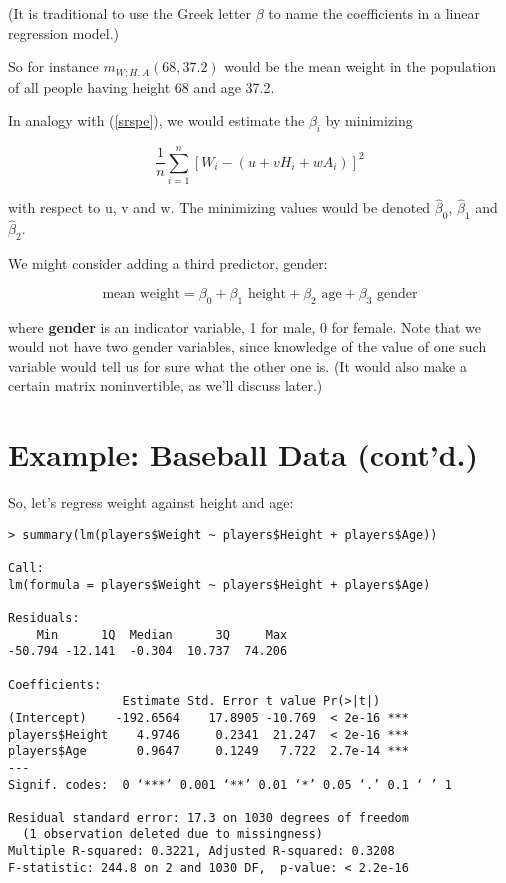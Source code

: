 (It is traditional to use the Greek letter $\beta$ to name the
coefficients in a linear regression model.)

So for instance $m_{W;H,A}(68,37.2)$ would be the mean weight in the
population of all people having height 68 and age 37.2.

In analogy with (\ref{srspe}), we would estimate the $\beta_i$ by
minimizing

\begin{equation}
\label{srspe2}
\frac{1}{n} \sum_{i=1}^n \left [ W_i - (u+vH_i+wA_i) \right ]^2
\end{equation}

with respect to u, v and w.  The minimizing values would be denoted
$\widehat{\beta}_0$, $\widehat{\beta}_1$ and $\widehat{\beta}_2$.

We might consider adding a third predictor, gender:

\begin{equation}
\label{wthtagegender}
\textrm{mean weight} = \beta_0 + \beta_1 \textrm{ height} + 
\beta_2 \textrm{ age} + \beta_3 \textrm{ gender}
\end{equation}

where {\bf gender} is an indicator variable, 1 for male, 0 for female.
Note that we would not have two gender variables, since knowledge of the
value of one such variable would tell us for sure what the other one is.
(It would also make a certain matrix noninvertible, as we'll discuss
later.)

\section{Example:  Baseball Data (cont'd.)}
\label{baseball2}

So, let's regress weight against height and age:

\begin{verbatim}
> summary(lm(players$Weight ~ players$Height + players$Age))

Call:
lm(formula = players$Weight ~ players$Height + players$Age)

Residuals:
    Min      1Q  Median      3Q     Max 
-50.794 -12.141  -0.304  10.737  74.206 

Coefficients:
                Estimate Std. Error t value Pr(>|t|)    
(Intercept)    -192.6564    17.8905 -10.769  < 2e-16 ***
players$Height    4.9746     0.2341  21.247  < 2e-16 ***
players$Age       0.9647     0.1249   7.722  2.7e-14 ***
---
Signif. codes:  0 ‘***’ 0.001 ‘**’ 0.01 ‘*’ 0.05 ‘.’ 0.1 ‘ ’ 1 

Residual standard error: 17.3 on 1030 degrees of freedom
  (1 observation deleted due to missingness)
Multiple R-squared: 0.3221,	Adjusted R-squared: 0.3208 
F-statistic: 244.8 on 2 and 1030 DF,  p-value: < 2.2e-16 
\end{verbatim}

